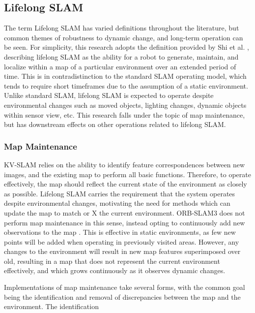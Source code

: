 \subsection{Lifelong SLAM}

The term Lifelong SLAM has varied definitions throughout the literature, but common themes of robustness to dynamic change, and long-term operation can be seen. For simplicity, this research adopts the definition provided by Shi et al. \cite{shiAreWeReady2020}, describing lifelong SLAM as the ability for a robot to generate, maintain, and localize within a map of a particular environment over an extended period of time. This is in contradistinction to the standard SLAM operating model, which tends to require short timeframes due to the assumption of a static environment. Unlike standard SLAM, lifelong SLAM is expected to operate despite environmental changes such as moved objects, lighting changes, dynamic objects within sensor view, etc. This research falls under the topic of map maintenance, but has downstream effects on other operations related to lifelong SLAM.

\subsubsection{Map Maintenance}

KV-SLAM relies on the ability to identify feature correspondences between new images, and the existing map to perform all basic functions. Therefore, to operate effectively, the map should reflect the current state of the environment as closely as possible. Lifelong SLAM carries the requirement that the system operates despite environmental changes, motivating the need for methods which can update the map to match or X the current environment. ORB-SLAM3 does not perform map maintenance in this sense, instead opting to continuously add new observations to the map \cite{camposORBSLAM3AccurateOpenSource2021}. This is effective in static environments, as few new points will be added when operating in previously visited areas. However, any changes to the environment will result in new map features superimposed over old, resulting in a map that does not represent the current environment effectively, and which grows continuously as it observes dynamic changes.

Implementations of map maintenance take several forms, with the common goal being the identification and removal of discrepancies between the map and the environment. The identification 

\subsubsection{}